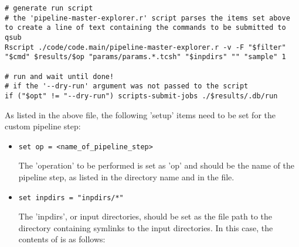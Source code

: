 \begin{enumerate}
\begin{lstlisting}
# generate run script
# the 'pipeline-master-explorer.r' script parses the items set above to create a line of text containing the commands to be submitted to qsub
Rscript ./code/code.main/pipeline-master-explorer.r -v -F "$filter" "$cmd" $results/$op "params/params.*.tcsh" "$inpdirs" "" "sample" 1

# run and wait until done!
# if the '--dry-run' argument was not passed to the script
if ("$opt" != "--dry-run") scripts-submit-jobs ./$results/.db/run 
\end{lstlisting}

As listed in the above  file, the following 'setup' items need to be set for the custom pipeline step:
\begin{itemize}
\item \begin{lstlisting}
set op = <name_of_pipeline_step>
\end{lstlisting}
The 'operation' to be performed is set as 'op' and should be the name of the pipeline step, as listed in the directory name and in the  file. 
\item \begin{lstlisting}
set inpdirs = "inpdirs/*"
\end{lstlisting}
The 'inpdirs', or input directories, should be set as the file path to the directory containing symlinks to the input directories. In this case, the contents of  is as follows:


\end{itemize}
\end{enumerate}
